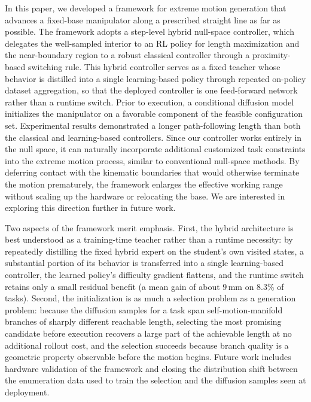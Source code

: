 \documentclass[journal, twoside]{IEEEtran}
\begin{document}
In this paper, we developed a framework for extreme motion generation that advances a fixed-base manipulator along a prescribed straight line as far as possible. The framework adopts a step-level hybrid null-space controller, which delegates the well-sampled interior to an RL policy for length maximization and the near-boundary region to a robust classical controller through a proximity-based switching rule. This hybrid controller serves as a fixed teacher whose behavior is distilled into a single learning-based policy through repeated on-policy dataset aggregation, so that the deployed controller is one feed-forward network rather than a runtime switch. Prior to execution, a conditional diffusion model initializes the manipulator on a favorable component of the feasible configuration set. Experimental results demonstrated a longer path-following length than both the classical and learning-based controllers. Since our controller works entirely in the null space, it can naturally incorporate additional customized task constraints into the extreme motion process, similar to conventional null-space methods. By deferring contact with the kinematic boundaries that would otherwise terminate the motion prematurely, the framework enlarges the effective working range without scaling up the hardware or relocating the base. We are interested in exploring this direction further in future work.

Two aspects of the framework merit emphasis. First, the hybrid architecture is best understood as a training-time teacher rather than a runtime necessity: by repeatedly distilling the fixed hybrid expert on the student's own visited states, a substantial portion of its behavior is transferred into a single learning-based controller, the learned policy's difficulty gradient flattens, and the runtime switch retains only a small residual benefit (a mean gain of about $9$\,mm on $8.3\%$ of tasks). Second, the initialization is as much a selection problem as a generation problem: because the diffusion samples for a task span self-motion-manifold branches of sharply different reachable length, selecting the most promising candidate before execution recovers a large part of the achievable length at no additional rollout cost, and the selection succeeds because branch quality is a geometric property observable before the motion begins. Future work includes hardware validation of the framework and closing the distribution shift between the enumeration data used to train the selection and the diffusion samples seen at deployment.
\end{document}
